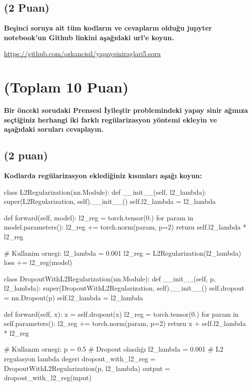 \documentclass[11pt]{article}
\begin{document}
    


\subsection{(2 Puan)} \textbf{Beşinci soruya ait tüm kodların ve cevapların olduğu jupyter notebook'un Github linkini aşağıdaki url'e koyun.}

\url{https://github.com/ozkancisil/yapaysiniraglari5.soru}

\section{(Toplam 10 Puan)} \textbf{Bir önceki sorudaki Prensesi İyileştir problemindeki yapay sinir ağınıza seçtiğiniz herhangi iki farklı regülarizasyon yöntemi ekleyin ve aşağıdaki soruları cevaplayın.} 

\subsection{(2 puan)} \textbf{Kodlarda regülarizasyon eklediğiniz kısımları aşağı koyun:} 

\begin{python}
class L2Regularization(nn.Module):
    def __init__(self, l2_lambda):
        super(L2Regularization, self).__init__()
        self.l2_lambda = l2_lambda

    def forward(self, model):
        l2_reg = torch.tensor(0.)
        for param in model.parameters():
            l2_reg += torch.norm(param, p=2)
        return self.l2_lambda * l2_reg

# Kullanim ornegi:
l2_lambda = 0.001
l2_reg = L2Regularization(l2_lambda)
loss += l2_reg(model)

class DropoutWithL2Regularization(nn.Module):
    def __init__(self, p, l2_lambda):
        super(DropoutWithL2Regularization, self).__init__()
        self.dropout = nn.Dropout(p)
        self.l2_lambda = l2_lambda

    def forward(self, x):
        x = self.dropout(x)
        l2_reg = torch.tensor(0.)
        for param in self.parameters():
            l2_reg += torch.norm(param, p=2)
        return x + self.l2_lambda * l2_reg

# Kullanım ornegi:
p = 0.5 # Dropout olasılığı
l2_lambda = 0.001 # L2 regulasyon lambda degeri
dropout_with_l2_reg = DropoutWithL2Regularization(p, l2_lambda)
output = dropout_with_l2_reg(input)
\end{python}
\end{document}
